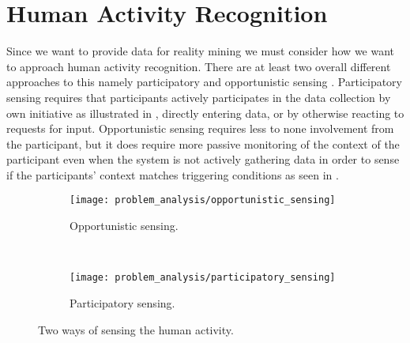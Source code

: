 
\section{Human Activity Recognition}
\label{sec:human_activity_recognition}

Since we want to provide data for reality mining we must consider how we want to approach human activity recognition. There are at least two overall different approaches to this namely participatory and opportunistic sensing \parencite{opp_or_par} \parencite{har_wearables}. Participatory sensing requires that participants actively participates in the data collection by own initiative as illustrated in , directly entering data, or by otherwise reacting to requests for input. Opportunistic sensing requires less to none involvement from the participant, but it does require more passive monitoring of the context of the participant even when the system is not actively gathering data in order to sense if the participants' context matches triggering conditions as seen in . 

\begin{figure}[!htbp]
\begin{subfigure}[!t]{.45\textwidth}
  \centering
  \texttt{[image: problem\_analysis/opportunistic\_sensing]}
  \caption{Opportunistic sensing.}
  \label{fig:opportunistic_sensing}
\end{subfigure}
~
\begin{subfigure}[!t]{.45\textwidth}
  \centering
  \texttt{[image: problem\_analysis/participatory\_sensing]}
  \caption{Participatory sensing.}
  \label{fig:participatory_sensing}
\end{subfigure}
\caption{Two ways of sensing the human activity.}
\label{fig:sensing_types}
\end{figure}
\FloatBarrier

